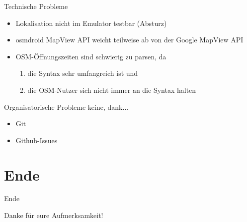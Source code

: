 \documentclass[hyperref]{beamer}
\begin{document}
\begin{frame}{Technische Probleme}
	\begin{itemize}
		\item Lokalisation nicht im Emulator testbar (Absturz)
        \item osmdroid MapView API weicht teilweise ab von der Google MapView API
		\item OSM-Öffnungszeiten sind schwierig zu parsen, da
		\begin{enumerate}
		  \item die Syntax sehr umfangreich ist und
		  \item die OSM-Nutzer sich nicht immer an die Syntax halten
		\end{enumerate}
	\end{itemize}
\end{frame}


\begin{frame}{Organisatorische Probleme}
	keine, dank...
	\begin{itemize}
		\item Git
		\item Github-Issues
	\end{itemize}
\end{frame}

\section{Ende}
\begin{frame}{Ende}
	\begin{center}
		Danke für eure Aufmerksamkeit!
	\end{center}
\end{frame}
\end{document}
